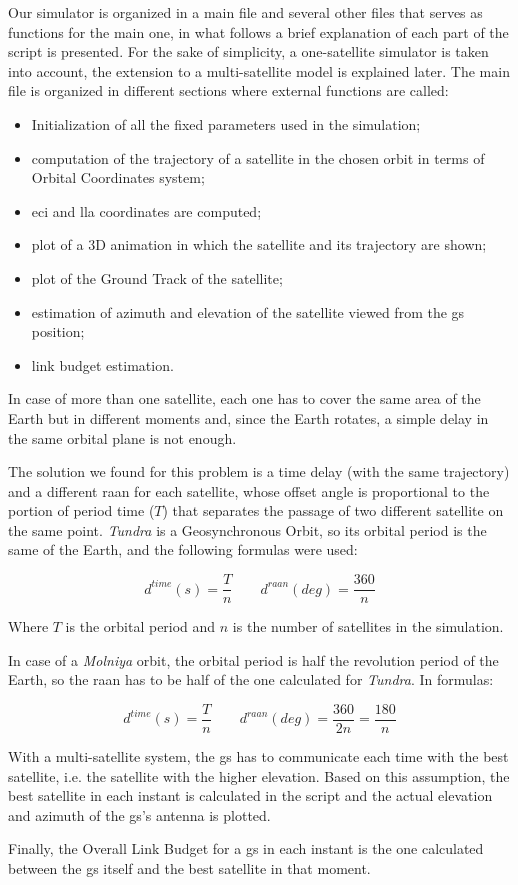 Our simulator is organized in a main file and several other files that serves as functions for the main one, in what follows a brief explanation of each part of the script is presented. For the sake of simplicity, a one-satellite simulator is taken into account, the extension to a multi-satellite model is explained later.
The main file is organized in different sections where external functions are called:
	\begin{itemize}
		\item Initialization of all the fixed parameters used in the simulation;
		\item computation of the trajectory of a satellite in the chosen orbit in terms of Orbital Coordinates system;
		\item \gls{eci} and \gls{lla} coordinates are computed;
		\item plot of a 3D animation in which the satellite and its trajectory are shown;
		\item plot of the Ground Track of the satellite;
		\item estimation of azimuth and elevation of the satellite viewed from the \gls{gs} position;
		\item link budget estimation.
	\end{itemize}

In case of more than one satellite, each one has to cover the same area of the Earth but in different moments and, since the Earth rotates, a simple delay in the same orbital plane is not enough.

The solution we found for this problem is a time delay (with the same trajectory) and a different \gls{raan} for each satellite, whose offset angle is proportional to the portion of period time ($T$) that separates the passage of two different satellite on the same point.
\textit{Tundra} is a Geosynchronous Orbit, so its orbital period is the same of the Earth, and the following formulas were used:

\begin{equation}
	d^{time}(s) = \frac{T}{n} \qquad d^{raan}(deg) = \frac{360}{n}
\end{equation}

Where $T$ is the orbital period and $n$ is the number of satellites in the simulation.

In case of a \textit{Molniya} orbit, the orbital period is half the revolution period of the Earth, so the \gls{raan} has to be half of the one calculated for \textit{Tundra}. In formulas:

\begin{equation}
	d^{time}(s) = \frac{T}{n} \qquad d^{raan}(deg) = \frac{360}{2n} = \frac{180}{n}
\end{equation}

With a multi-satellite system, the \gls{gs} has to communicate each time with the best satellite, i.e. the satellite with the higher elevation. Based on this assumption, the best satellite in each instant is calculated in the script and the actual elevation and azimuth of the \gls{gs}'s antenna is plotted.

Finally, the Overall Link Budget for a \gls{gs} in each instant is the one calculated between the \gls{gs} itself and the best satellite in that moment.
